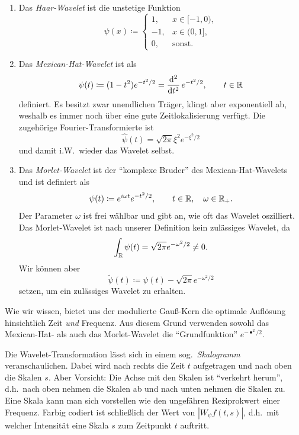 \begin{example}[Wavelets]
\begin{enumerate}
\item Das \emph{Haar-Wavelet} ist die unstetige Funktion
  \[
    \psi(x) \coloneqq \begin{cases}
      1, & x \in [-1,0), \\
      -1, & x \in (0,1], \\
      0, & \text{sonst}.
    \end{cases}
  \]
\item Das \emph{Mexican-Hat-Wavelet} ist als
  \[
    \psi(t) \coloneqq (1 - t^{2}) e^{-t^{2} / 2} = \dod[2]{}{t} e^{-t^{2} / 2}, \qquad t \in \R
  \]
  definiert. Es besitzt zwar unendlichen Träger, klingt aber exponentiell ab, weshalb es immer noch
  über eine gute Zeitlokalisierung verfügt. Die zugehörige Fourier-Transformierte ist
  \[
    \widehat{\psi}(t) = \sqrt{2\pi} \xi^{2} e^{-\xi^{2} / 2}
  \]
  und damit i.W.\ wieder das Wavelet selbst.
\item Das \emph{Morlet-Wavelet} ist der \enquote{komplexe Bruder} des Mexican-Hat-Wavelets und ist
  definiert als
  \[
    \psi(t) \coloneqq e^{i \omega t} e^{-t^{2} / 2}, \qquad t \in \mathbb{R}, \quad \omega \in \mathbb{R}_{+}.
  \]
  Der Parameter $ \omega $ ist frei wählbar und gibt an, wie oft das Wavelet oszilliert.
  Das Morlet-Wavelet ist nach unserer Definition kein zulässiges Wavelet, da
  \[
    \int_{\mathbb{R}} \psi(t) = \sqrt{2\pi} e^{-\omega^{2} / 2} \neq 0.
  \]
  Wir können aber
  \[
    \widetilde{\psi}(t) \coloneqq \psi(t) - \sqrt{2\pi} e^{-\omega^{2} / 2}
  \]
  setzen, um ein zulässiges Wavelet zu erhalten.
\end{enumerate}
\end{example}

\begin{remark}
Wie wir wissen, bietet uns der modulierte Gauß-Kern die optimale Auflösung hinsichtlich Zeit
\emph{und} Frequenz. Aus diesem Grund verwenden sowohl das Mexican-Hat- als auch das Morlet-Wavelet
die \enquote{Grundfunktion} $ e^{-\bullet^{2} / 2} $.
\end{remark}

\begin{remark}[Skalogramm]
Die Wavelet-Transformation lässt sich in einem sog.\ \emph{Skalogramm} veranschaulichen. Dabei wird
nach rechts die Zeit $ t $ aufgetragen und nach oben die Skalen $ s $. Aber Vorsicht: Die Achse mit
den Skalen ist \enquote{verkehrt herum}, d.h.\ nach oben nehmen die Skalen ab und nach unten nehmen
die Skalen zu. Eine Skala kann man sich vorstellen wie den ungefähren Reziprokwert einer Frequenz.
Farbig codiert ist schließlich der Wert von $ |W_{\psi}f(t,s)| $, d.h.\ mit welcher Intensität eine
Skala $ s $ zum Zeitpunkt $ t $ auftritt.
\end{remark}

